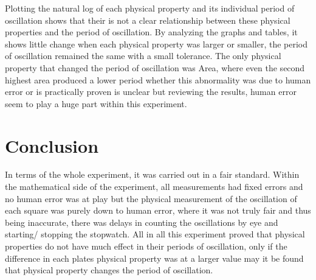 \documentclass[12pt]{article}
\begin{document}
Plotting the natural log of each physical property and its individual period of oscillation shows that their is not a clear relationship between these physical properties and the period of oscillation. By analyzing the graphs and tables, it shows little change when each physical property was larger or smaller, the period of oscillation remained the same with a small tolerance. The only physical property that changed the period of oscillation was Area, where even the second highest area produced a lower period whether this abnormality was due to human error or is practically proven is unclear but reviewing the results, human error seem to play a huge part within this experiment.  


\section{Conclusion}
\label{Conclusion Section}

In terms of the whole experiment, it was carried out in a fair standard. Within the mathematical side of the experiment, all measurements had fixed errors and no human error was at play but the physical measurement of the oscillation of each square was purely down to human error, where it was not truly fair and thus being inaccurate, there was delays in counting the oscillations by eye and starting/ stopping the stopwatch. All in all this experiment proved that physical properties do not have much effect in their periods of oscillation, only if the difference in each plates physical property was at a larger value may it be found that physical property changes the period of oscillation.





\end{document}
